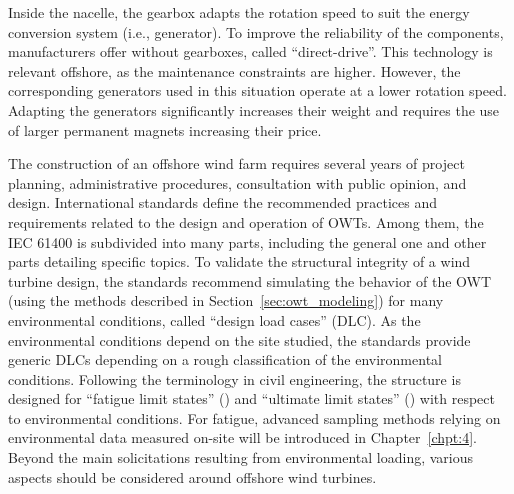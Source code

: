 Inside the nacelle, the gearbox adapts the rotation speed to suit the energy conversion system (i.e., generator). 
To improve the reliability of the components, manufacturers offer without gearboxes, called ``direct-drive''. 
This technology is relevant offshore, as the maintenance constraints are higher. 
However, the corresponding generators used in this situation operate at a lower rotation speed. 
Adapting the generators significantly increases their weight and requires the use of larger permanent magnets increasing their price.   

The construction of an offshore wind farm requires several years of project planning, administrative procedures, consultation with public opinion, and design. 
International standards define the recommended practices and requirements related to the design and operation of OWTs. 
Among them, the IEC 61400 is subdivided into many parts, including the general one \citep{iec_2019} and other parts detailing specific topics.       
To validate the structural integrity of a wind turbine design, the standards recommend simulating the behavior of the OWT (using the methods described in Section~\ref{sec:owt_modeling}) for many environmental conditions, called ``design load cases'' (DLC). 
As the environmental conditions depend on the site studied, the standards provide generic DLCs depending on a rough classification of the environmental conditions. 
Following the terminology in civil engineering, the structure is designed for ``fatigue limit states'' () and ``ultimate limit states'' () with respect to environmental conditions. 
For fatigue, advanced sampling methods relying on environmental data measured on-site will be introduced in Chapter~\ref{chpt:4}. 
Beyond the main solicitations resulting from environmental loading, various aspects should be considered around offshore wind turbines. 

